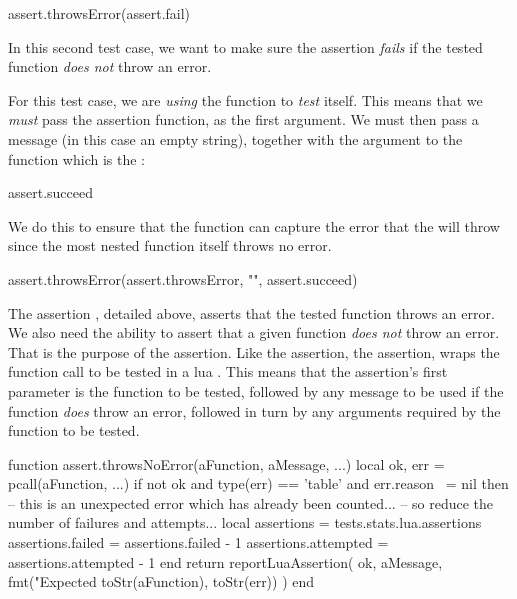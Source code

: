 \startLuaTest
  assert.throwsError(assert.fail)
\stopLuaTest
\stopTestCase


In this second test case, we want to make sure the assertion \emph{fails} 
if the tested function \emph{does not} throw an error.

For this test case, we are \emph{using} the  
function to \emph{test} itself. This means that we \emph{must} pass the 
assertion function,  as the first argument. We 
must then pass a message (in this case an empty string), together with the 
argument to the   function which is 
the : 

\starttyping[option=lua]
  assert.succeed
\stoptyping

\noindent We do this to ensure that the  
 function can capture the error that the 
  will throw since the most 
 nested function itself throws no error. 

\startLuaTest
  assert.throwsError(assert.throwsError, "", assert.succeed)
\stopLuaTest
\stopTestCase

\stopTestSuite


The assertion , detailed above, asserts that the 
tested function throws an error. We also need the ability to assert that a 
given function \emph{does not} throw an error. That is the purpose of the 
 assertion. Like the  
assertion, the  assertion, wraps the function 
call to be tested in a lua . This means that the 
 assertion's first parameter is the function to 
be tested, followed by any message to be used if the function \emph{does} 
throw an error, followed in turn by any arguments required by the function 
to be tested. 

\startLuaCode
function assert.throwsNoError(aFunction, aMessage, ...)
  local ok, err = pcall(aFunction, ...)
  if not ok and type(err) == 'table' and err.reason ~= nil then
    -- this is an unexpected error which has already been counted...
    -- so reduce the number of failures and attempts...
    local assertions = tests.stats.lua.assertions
    assertions.failed    = assertions.failed    - 1
    assertions.attempted = assertions.attempted - 1
  end
  return reportLuaAssertion(
    ok,
    aMessage,
    fmt("Expected %
      toStr(aFunction), toStr(err))
  )
end
\stopLuaCode

